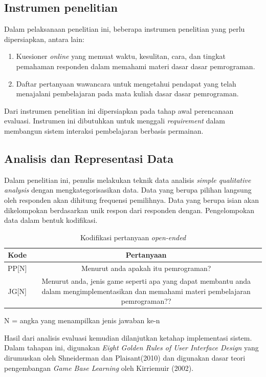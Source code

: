 	\subsection{Instrumen penelitian}
	
	Dalam pelaksanaan penelitian ini, beberapa instrumen penelitian yang perlu dipersiapkan, antara lain:
	
	\begin{enumerate}
		\item Kuesioner \textit{online} yang memuat waktu, kesulitan, cara, dan tingkat pemahaman responden dalam memahami materi dasar dasar pemrograman.
		\item Daftar pertanyaan wawancara untuk mengetahui pendapat yang telah menajalani pembelajaran pada mata kuliah dasar dasar pemrograman.
	\end{enumerate}

	Dari instrumen penelitian ini dipersiapkan pada tahap awal perencanaan evaluasi. Instrumen ini dibutuhkan untuk menggali \textit{requirement} dalam membangun sistem interaksi pembelajaran berbasis permainan.
	
	\subsection{Analisis dan Representasi Data}
	
	Dalam penelitian ini, penulis melakukan teknik data analisis \textit{simple qualitative analysis} dengan mengkategorisasikan data. Data yang berupa pilihan langsung oleh responden akan dihitung frequensi pemilihnya. Data yang berupa isian akan dikelompokan berdasarkan unik respon dari responden dengan. Pengelompokan data dalam bentuk kodifikasi.
	\begin{table}
		\centering
		\caption{Kodifikasi pertanyaan \textit{open-ended}}
		\label{tab:tab1}
		\begin{tabular}{| c | c |}
			\hline
			Kode & Pertanyaan \\
			\hline
			PP[N] & \multicolumn{1}{p{10cm}|}{Menurut anda apakah itu pemrograman?}\\ \hline
			JG[N] & \multicolumn{1}{p{10cm}|}{Menurut anda, jenis game seperti apa yang dapat membantu anda dalam mengimplementasikan dan memahami materi pembelajaran pemrograman??} \\ \hline
		\end{tabular}
		\vspace{1ex}
		
		\raggedright \small{N = angka yang menampilkan jenis jawaban ke-n}
	\end{table}
	Hasil dari analisis evaluasi kemudian dilanjutkan ketahap implementasi sistem. Dalam tahapan ini, digunakan \textit{Eight Golden Rules of User Interface Design} yang dirumuskan oleh Shneiderman dan Plaisant(2010) dan digunakan dasar teori pengembangan \textit{Game Base Learning} oleh Kirriemuir (2002).
	
